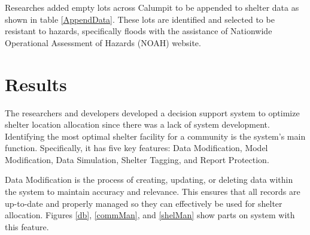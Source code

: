 \documentclass[12pt,a4paper,]{article}
\begin{document}
	Researches added empty lots across Calumpit to be appended to shelter data as shown in table \ref{AppendData}. These lots are identified and selected to be resistant to hazards, specifically floods with the assistance of Nationwide Operational Assessment of Hazards (NOAH) website. 
	
	\begin{table}[h]
		\centering
		\caption{Sources of Appended Shelter Data}
		\label{AppendData}
	\end{table}
	
\section{Results}
	The researchers and developers developed a decision support system to optimize shelter location allocation since there was a lack of system development. Identifying the most optimal shelter facility for a community is the system's main function. Specifically, it has five key features: Data Modification, Model Modification, Data Simulation, Shelter Tagging, and Report Protection.
	
	Data Modification is the process of creating, updating, or deleting data within the system to maintain accuracy and relevance. This ensures that all records are up-to-date and properly managed so they can effectively be used for shelter allocation. Figures \ref{db}, \ref{commMan}, and \ref{shelMan} show parts on system with this feature.
	
\end{document}
